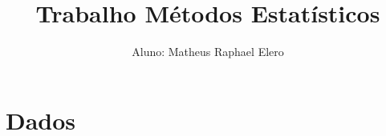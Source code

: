 \documentclass[a4paper,12pt]{article}
\begin{document}


\title{Trabalho Métodos Estatísticos}

\author{Aluno: Matheus Raphael Elero}

\maketitle

\section{Dados}
\end{document}
